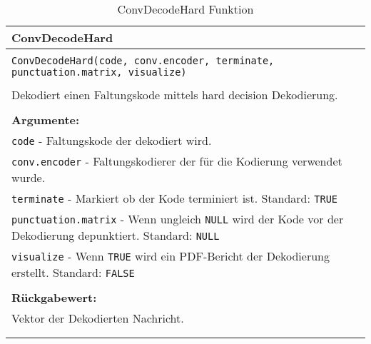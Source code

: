 \begin{longtable}{|p{\textwidth}|}
\hline
\rowcolor{lightblue}
ConvDecodeHard
\\
\hline
\\
\texttt{ConvDecodeHard(code, conv.encoder, terminate, punctuation.matrix, visualize)}\\
\\
Dekodiert einen Faltungskode mittels hard decision Dekodierung.\\
\\
\textbf{Argumente:}\\
\texttt{code} - Faltungskode der dekodiert wird.\\
\texttt{conv.encoder} - Faltungskodierer der für die Kodierung verwendet wurde.\\
\texttt{terminate} - Markiert ob der Kode terminiert ist. Standard: \texttt{TRUE}\\
\texttt{punctuation.matrix} - Wenn ungleich \texttt{NULL} wird der Kode vor der Dekodierung depunktiert. Standard: \texttt{NULL}\\
\texttt{visualize} - Wenn \texttt{TRUE} wird ein PDF-Bericht der Dekodierung erstellt. Standard: \texttt{FALSE}\\
\\
\textbf{Rückgabewert:}\\
Vektor der Dekodierten Nachricht.\\
\\
\hline
\caption{ConvDecodeHard Funktion}
\end{longtable}